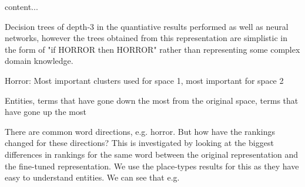 \begin{table}[]\label{difference how top directions in original rep have changed}
	content...
\end{table}
 


Decision trees of depth-3 in the quantiative results performed as well as neural networks, however the trees obtained from this representation are simplistic in the form of "if HORROR then HORROR" rather than representing some complex domain knowledge.




\begin{table}[]\label{ch5:clustersusedintrees}
	Horror: Most important clusters used for space 1, most important for space 2
\end{table}




\begin{table}[]\label{Biggest difference in entities (entities that have gone down/gone up the most) for the same directions }
	Entities, terms that have gone down the most from the original space, terms that have gone up the most
\end{table}


There are common word directions, e.g. horror. But how have the rankings changed for these directions? This is investigated by looking at the biggest differences in rankings for the same word between the original representation and the fine-tuned representation. We use the place-types results for this as they have easy to understand entities. We can see that e.g.

























